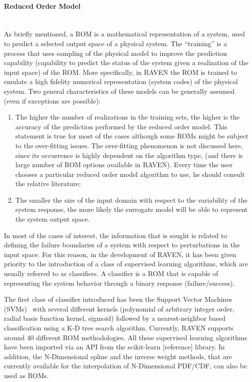 \paragraph{Reduced Order Model} ~\\
 As briefly mentioned, a ROM is a mathematical representation of a system, used to predict a selected output space of a physical system. 
The ``training'' is a process that uses sampling of the physical model to improve the prediction capability (capability to predict the status of the system given a realization of the input space) of the ROM. More specifically, in RAVEN the ROM is trained to emulate a high fidelity numerical representation (system codes) of the physical system. Two general characteristics of these models can be generally assumed (even if exceptions are possible):
\begin{enumerate}
   \item The higher the number of realizations in the training sets, the higher is the accuracy of the prediction performed by the reduced order model. This statement is true for most of the cases although some ROMs might be subject to the over-fitting issues. The over-fitting phenomenon is not discussed here, since its occurrence is highly dependent on the algorithm type, (and there is large number of ROM options available in RAVEN). Every time the user chooses a particular reduced order model algorithm to use, he should consult the relative literature;
   \item The smaller the size of the input domain with respect to the variability of the system response, the more likely the surrogate model will be able to represent the system output space.
\end{enumerate}

In most of the cases of interest, the information that is sought is related to defining the failure boundaries of a system with respect to perturbations in the input space. For this reason, in the development of RAVEN, it has been given priority to the introduction of a class of supervised learning algorithms, which are usually referred to as classifiers. A classifier is a ROM that is capable of representing the system behavior through a binary response (failure/success). 

The first class of classifier introduced has been the Support Vector Machines (SVMs)~\cite{} with several different kernels (polynomial of arbitrary integer order, radial basis function kernel, sigmoid) followed by a nearest-neighbor based classification using a K-D tree search algorithm. Currently, RAVEN supports around 40 different ROM methodologies. All these supervised learning algorithms have been imported via an API from the scikit-learn [reference] library. In addition, the N-Dimensional spline and the inverse weight methods, that are currently available for the interpolation of N-Dimensional PDF/CDF, can also be used as ROMs.

